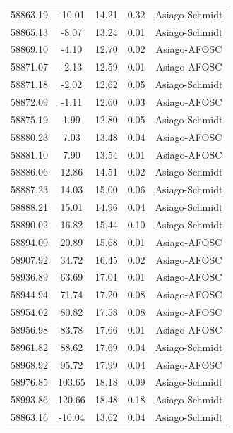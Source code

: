 \begin{longtable}{|c|c|c|c|c|}
 58863.19 &  -10.01 &       14.21 &          0.32 & Asiago-Schmidt   \\
 58865.13 &   -8.07 &       13.24 &          0.01 & Asiago-Schmidt \\
 58869.10 &   -4.10 &       12.70 &          0.02 & Asiago-AFOSC  \\
 58871.07 &   -2.13 &       12.59 &          0.01 & Asiago-AFOSC  \\
 58871.18 &   -2.02 &       12.62 &          0.05 & Asiago-Schmidt \\
 58872.09 &   -1.11 &       12.60 &          0.03 & Asiago-AFOSC    \\
 58875.19 &    1.99 &       12.80 &          0.05 & Asiago-Schmidt \\
 58880.23 &    7.03 &       13.48 &          0.04 & Asiago-AFOSC  \\
 58881.10 &    7.90 &       13.54 &          0.01 & Asiago-AFOSC  \\
 58886.06 &   12.86 &       14.51 &          0.02 & Asiago-Schmidt \\
 58887.23 &   14.03 &       15.00 &          0.06 & Asiago-Schmidt \\
 58888.21 &   15.01 &       14.96 &          0.04 & Asiago-Schmidt \\
 58890.02 &   16.82 &       15.44 &          0.10 & Asiago-Schmidt \\
 58894.09 &   20.89 &       15.68 &          0.01 & Asiago-AFOSC  \\
 58907.92 &   34.72 &       16.45 &          0.02 & Asiago-AFOSC  \\
 58936.89 &   63.69 &       17.01 &          0.01 & Asiago-AFOSC  \\
 58944.94 &   71.74 &       17.20 &          0.08 & Asiago-AFOSC  \\
 58954.02 &   80.82 &       17.58 &          0.08 & Asiago-AFOSC  \\
 58956.98 &   83.78 &       17.66 &          0.01 & Asiago-AFOSC  \\
 58961.82 &   88.62 &       17.69 &          0.04 & Asiago-Schmidt \\
 58968.92 &   95.72 &       17.99 &          0.04 & Asiago-AFOSC  \\
 58976.85 &  103.65 &       18.18 &          0.09 & Asiago-Schmidt \\
 58993.86 &  120.66 &       18.48 &          0.18 & Asiago-Schmidt \\
 58863.16 &  -10.04 &       13.62 &          0.04 & Asiago-Schmidt   \\

\end{longtable}
